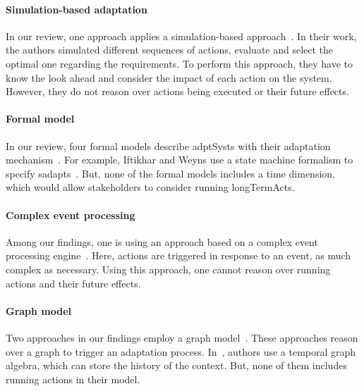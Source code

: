 \paragraph{Simulation-based adaptation}
In our review, one approach applies a simulation-based approach~\cite{DBLP:conf/smartgridsec/0001FKNT14}.
In their work, the authors simulated different sequences of \glspl{action}, evaluate and select the optimal one regarding the requirements.
To perform this approach, they have to know the look ahead and consider the impact of each action on the system.
However, they do not reason over \glspl{action} being executed or their future effects.
	
\paragraph{Formal model}
In our review, four formal models describe \glspl{adptSyst} with their adaptation mechanism~\cite{DBLP:journals/taas/WeynsMA12, DBLP:conf/icse/IftikharW14a, DBLP:journals/taas/WeynsHH10, DBLP:conf/icse/BartelsK11}.
For example, Iftikhar and Weyns use a state machine formalism to specify \glspl{sadapt}~\cite{DBLP:conf/icse/IftikharW14a}.
But, none of the formal models includes a time dimension, which would allow stakeholders to consider running \glspl{longTermAct}.

\paragraph{Complex event processing}
Among our findings, one is using an approach based on a complex event processing engine~\cite{DBLP:conf/rr/AnicicFRSSS10}.
Here, \glspl{action} are triggered in response to an event, as much complex as necessary.
Using this approach, one cannot reason over running \glspl{action} and their future effects.

\paragraph{Graph model}
Two approaches in our findings employ a graph model~\cite{DBLP:journals/tse/KramerM90, DBLP:conf/dbpl/MoffittS17}.
These approaches reason over a graph to trigger an adaptation process.
In~\cite{DBLP:conf/dbpl/MoffittS17}, authors use a temporal graph algebra, which can store the history of the context.
But, none of them includes running \glspl{action} in their model.
	
